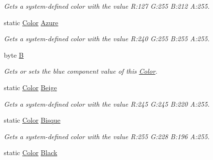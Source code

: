 \begin{DoxyCompactItemize}
\begin{DoxyCompactList}\small\item\em Gets a system-\/defined color with the value R\+:127 G\+:255 B\+:212 A\+:255.\end{DoxyCompactList}\item 
static \hyperlink{structMicrosoft_1_1Xna_1_1Framework_1_1Color}{Color} \hyperlink{structMicrosoft_1_1Xna_1_1Framework_1_1Color_ac41ebd9c2b2a6b82e2c489c4b2738362}{Azure}
\begin{DoxyCompactList}\small\item\em Gets a system-\/defined color with the value R\+:240 G\+:255 B\+:255 A\+:255.\end{DoxyCompactList}\item 
byte \hyperlink{structMicrosoft_1_1Xna_1_1Framework_1_1Color_af20775d9682d3bc9365ca7b2a6792298}{B}
\begin{DoxyCompactList}\small\item\em Gets or sets the blue component value of this \hyperlink{structMicrosoft_1_1Xna_1_1Framework_1_1Color}{Color}.\end{DoxyCompactList}\item 
static \hyperlink{structMicrosoft_1_1Xna_1_1Framework_1_1Color}{Color} \hyperlink{structMicrosoft_1_1Xna_1_1Framework_1_1Color_a2fb95d3e28de67182b1205dec8a0b657}{Beige}
\begin{DoxyCompactList}\small\item\em Gets a system-\/defined color with the value R\+:245 G\+:245 B\+:220 A\+:255.\end{DoxyCompactList}\item 
static \hyperlink{structMicrosoft_1_1Xna_1_1Framework_1_1Color}{Color} \hyperlink{structMicrosoft_1_1Xna_1_1Framework_1_1Color_a27f39ca0f86138a9978d54ba8d59768f}{Bisque}
\begin{DoxyCompactList}\small\item\em Gets a system-\/defined color with the value R\+:255 G\+:228 B\+:196 A\+:255.\end{DoxyCompactList}\item 
static \hyperlink{structMicrosoft_1_1Xna_1_1Framework_1_1Color}{Color} \hyperlink{structMicrosoft_1_1Xna_1_1Framework_1_1Color_a490360be3af8e93c455d892cb7a05dd9}{Black}

\end{DoxyCompactItemize}

